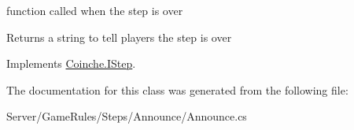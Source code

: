 function called when the step is over 

\begin{DoxyReturn}{Returns}
a string to tell players the step is over
\end{DoxyReturn}


Implements \hyperlink{interface_coinche_1_1_i_step_a86ef55b4c36ffa27f5fa18a10e9a61a0}{Coinche.\+I\+Step}.



The documentation for this class was generated from the following file\+:\begin{DoxyCompactItemize}
\item 
Server/\+Game\+Rules/\+Steps/\+Announce/Announce.\+cs\end{DoxyCompactItemize}

